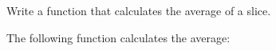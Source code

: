 \begin{Exercise}[title={Average},difficulty=0]
\label{ex:average}
\Question\label{ex:average q1} Write a function that calculates
the average of a  slice.
\end{Exercise}

\begin{Answer}
\Question The following function calculates the average:

\showremarks
\end{Answer}
